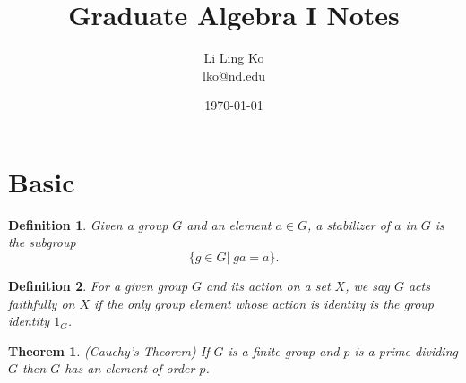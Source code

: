 \documentclass{article}
\newtheorem{mydef}{Definition}[section]
\newtheorem{mythm}{Theorem}[section]
\begin{document}
\title{Graduate Algebra I Notes}
\author{Li Ling Ko\\ lko@nd.edu}
\date{\today}
\maketitle

\section{Basic}
\begin{mydef}
  Given a group $G$ and an element $a\in G$, a \emph{stabilizer} of $a$ in
  $G$ is the subgroup
  \begin{equation*}
    \{g\in G|\; ga=a\}.
  \end{equation*}
\end{mydef}

\begin{mydef}
  For a given group $G$ and its action on a set $X$, we say $G$ acts
  \emph{faithfully} on $X$ if the only group element whose action is
  identity is the group identity $1_G$.
\end{mydef}

\begin{mythm}
  (\emph{Cauchy's Theorem}) If $G$ is a finite group and $p$ is a prime
  dividing $G$ then $G$ has an element of order $p$. 
\end{mythm}
\end{document}
